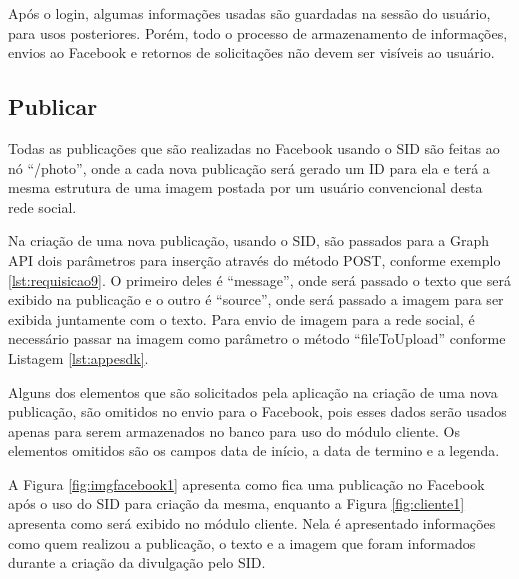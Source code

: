Após o login, algumas informações usadas são guardadas na sessão do usuário, para usos posteriores. Porém, todo o processo de armazenamento de informações, envios ao Facebook e retornos de solicitações não devem ser visíveis ao usuário. 

\subsection{Publicar}
Todas as publicações que são realizadas no Facebook usando o SID são feitas ao nó ``/photo'', onde a cada nova publicação será gerado um ID para ela e terá a mesma estrutura de uma imagem postada por um usuário convencional desta rede social.

Na criação de uma nova publicação, usando o SID, são passados para a Graph API dois parâmetros para inserção através do método POST, conforme exemplo \ref{lst:requisicao9}. O primeiro deles é “message”, onde será passado o texto que será exibido na publicação e o outro é “source”, onde será passado a imagem para ser exibida juntamente com o texto. Para envio de imagem para a rede social, é necessário passar na imagem como parâmetro o método “fileToUpload” conforme Listagem \ref{lst:appesdk}. 

Alguns dos elementos que são solicitados pela aplicação na criação de uma nova publicação, são omitidos no envio para o Facebook, pois esses dados serão usados apenas para serem armazenados no banco para uso do módulo cliente. Os elementos omitidos são os campos data de início, a data de termino e a legenda. 

A Figura \ref{fig:imgfacebook1} apresenta como fica uma publicação no Facebook após o uso do SID para criação da mesma, enquanto a Figura \ref{fig:cliente1} apresenta como será exibido no módulo cliente. Nela é apresentado informações como quem realizou a publicação, o texto e a imagem que foram informados durante a criação da divulgação pelo SID.

